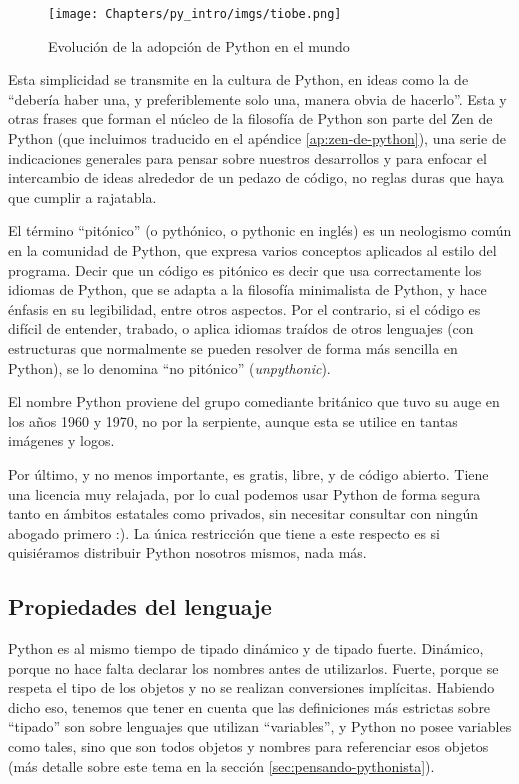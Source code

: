 \begin{figure}
    \texttt{[image: Chapters/py\_intro/imgs/tiobe.png]}
    \caption{Evolución de la adopción de Python en el mundo}
\end{figure}

Esta simplicidad se transmite en la cultura de Python, en ideas como la de ``debería haber una, y preferiblemente solo una, manera obvia de hacerlo''. Esta y otras frases que forman el núcleo de la filosofía de Python son parte del Zen de Python \cite{zen-de-python} (que incluimos traducido en el apéndice \ref{ap:zen-de-python}), una serie de indicaciones generales para pensar sobre nuestros desarrollos y para enfocar el intercambio de ideas alrededor de un pedazo de código, no reglas duras que haya que cumplir a rajatabla.

El término ``pitónico'' (o pythónico, o pythonic en inglés) es un neologismo común en la comunidad de Python, que expresa varios conceptos aplicados al estilo del programa. Decir que un código es pitónico es decir que usa correctamente los idiomas de Python, que se adapta a la filosofía minimalista de Python, y hace énfasis en su legibilidad, entre otros aspectos. Por el contrario, si el código es difícil de entender, trabado, o aplica idiomas traídos de otros lenguajes (con estructuras que normalmente se pueden resolver de forma más sencilla en Python), se lo denomina ``no pitónico'' (\textit{unpythonic}).

\begin{info}
El nombre Python proviene del grupo comediante británico que tuvo su auge en los años 1960 y 1970, no por la serpiente, aunque esta se utilice en tantas imágenes y logos.
\end{info}

Por último, y no menos importante, es gratis, libre, y de código abierto. Tiene una licencia muy relajada, por lo cual podemos usar Python de forma segura tanto en ámbitos estatales como privados, sin necesitar consultar con ningún abogado primero :). La única restricción que tiene a este respecto es si quisiéramos distribuir Python nosotros mismos, nada más.


\subsection{Propiedades del lenguaje}\label{intro--propiedades-del-lenguaje}

Python es al mismo tiempo de tipado dinámico y de tipado fuerte. Dinámico, porque no hace falta declarar los nombres antes de utilizarlos. Fuerte, porque se respeta el tipo de los objetos y no se realizan conversiones implícitas. Habiendo dicho eso, tenemos que tener en cuenta que las definiciones más estrictas sobre ``tipado'' son sobre lenguajes que utilizan ``variables'', y Python no posee variables como tales, sino que son todos objetos y nombres para referenciar esos objetos (más detalle sobre este tema en la sección \ref{sec:pensando-pythonista}).

